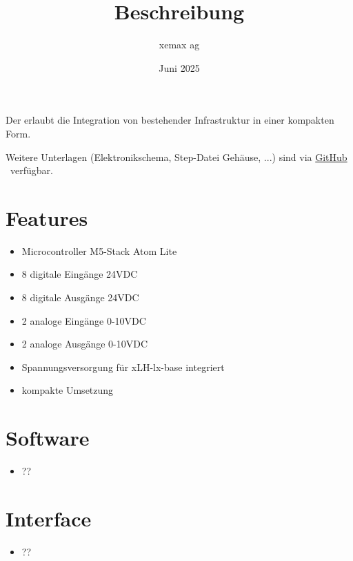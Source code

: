 \documentclass[10pt]{datasheet}
\title{Beschreibung \xlhPlattformID}
\author{xemax ag}
\date{Juni 2025}
\begin{document}
\maketitle



Der \xlhPlattformID erlaubt die Integration von bestehender Infrastruktur in einer kompakten Form.

Weitere Unterlagen (Elektronikschema, Step-Datei Gehäuse, ...) sind via
\href{https://github.com/xemax-ag/xLH/}{GitHub \xlhPlattformID}\ verfügbar.

\section{Features}

\begin{itemize}
    \item Microcontroller M5-Stack Atom Lite
    \item 8 digitale Eingänge 24VDC
    \item 8 digitale Ausgänge 24VDC
    \item 2 analoge Eingänge 0-10VDC
    \item 2 analoge Ausgänge 0-10VDC
    \item Spannungsversorgung für xLH-lx-base integriert
    \item kompakte Umsetzung
\end{itemize}

\section{Software}

\begin{itemize}
    \item ??
\end{itemize}

\section{Interface}

\begin{itemize}
    \item ??
\end{itemize}

\vfill\break
\end{document}
